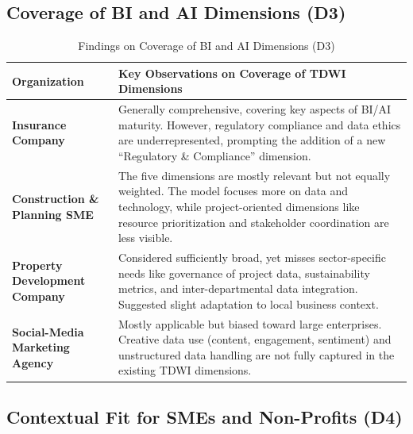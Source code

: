 \documentclass[conference]{IEEEtran}
\begin{document}
\subsection{Coverage of BI and AI Dimensions (D3)}
\label{sec:coverage_results}

\begin{table}[h!]
\centering
\caption{Findings on Coverage of BI and AI Dimensions (D3)}
\label{tab:d3_coverage}
\renewcommand{\arraystretch}{1.2}
\begin{tabular}{p{.16\linewidth} p{.74\linewidth}}
\hline
\textbf{Organization} & \textbf{Key Observations on Coverage of TDWI Dimensions} \\ \hline

\textbf{Insurance Company} & Generally comprehensive, covering key aspects of BI/AI maturity. However, regulatory compliance and data ethics are underrepresented, prompting the addition of a new “Regulatory \& Compliance” dimension. \\ \hline

\textbf{Construction \& Planning SME} & The five dimensions are mostly relevant but not equally weighted. The model focuses more on data and technology, while project-oriented dimensions like resource prioritization and stakeholder coordination are less visible. \\ \hline

\textbf{Property Development Company} & Considered sufficiently broad, yet misses sector-specific needs like governance of project data, sustainability metrics, and inter-departmental data integration. Suggested slight adaptation to local business context. \\ \hline

\textbf{Social-Media Marketing Agency} & Mostly applicable but biased toward large enterprises. Creative data use (content, engagement, sentiment) and unstructured data handling are not fully captured in the existing TDWI dimensions. \\ \hline
\end{tabular}
\end{table}

\subsection{Contextual Fit for SMEs and Non-Profits (D4)}
\label{sec:contextual_fit_results}
\end{document}
